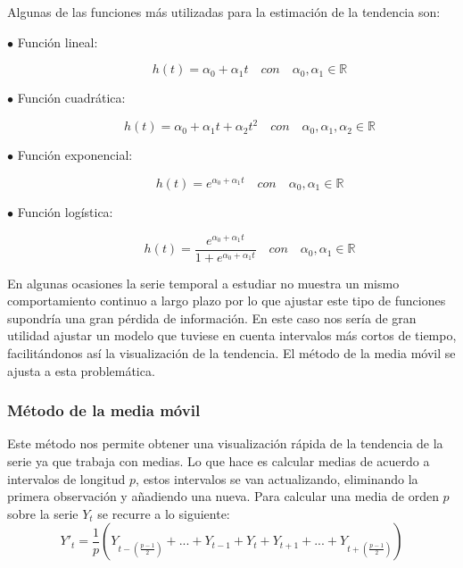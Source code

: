 Algunas de las funciones más utilizadas para la estimación de la tendencia son:
\begin{description}
  \item[$\bullet$ Función lineal:]
      \begin{equation}
        h(t) = \alpha_0 + \alpha_1 t \quad con \quad \alpha_0, \alpha_1 \in \mathbb{R}
      \end{equation}
  \item[$\bullet$ Función cuadrática:]
      \begin{equation}
        h(t) = \alpha_0 + \alpha_1 t + \alpha_2 t^2 \quad con \quad \alpha_0, \alpha_1, \alpha_2 \in \mathbb{R}
      \end{equation}
  \item[$\bullet$ Función exponencial:]
      \begin{equation}
        h(t) = e^{\alpha_0 + \alpha_1 t} \quad con \quad \alpha_0, \alpha_1 \in \mathbb{R}
      \end{equation}
  \item[$\bullet$ Función logística:]
      \begin{equation}
        h(t) = \frac{e^{\alpha_0 + \alpha_1 t}}{1 + e^{\alpha_0 + \alpha_1 t}} \quad con \quad \alpha_0, \alpha_1 \in \mathbb{R}
      \end{equation}
\end{description}

En algunas ocasiones la serie temporal a estudiar no muestra un mismo comportamiento continuo a largo plazo por lo que ajustar este tipo de funciones supondría una gran pérdida de información. En este caso nos sería de gran utilidad ajustar un modelo que tuviese en cuenta intervalos más cortos de tiempo, facilitándonos así la visualización de la tendencia. El método de la media móvil se ajusta a esta problemática.

\subsubsection{Método de la media móvil}

Este método nos permite obtener una visualización rápida de la tendencia de la serie ya que trabaja con medias. Lo que hace es calcular medias de acuerdo a intervalos de longitud $p$, estos intervalos se van actualizando, eliminando la primera observación y añadiendo una nueva. Para calcular una media de orden $p$ sobre la serie $Y_t$ se recurre a lo siguiente:
\begin{equation}
    Y'_{t} = \frac{1}{p}\left(Y_{t-\left(\frac{p-1}{2}\right)}+...+Y_{t-1}+Y_t+Y_{t+1}+...+Y_{t+\left(\frac{p-1}{2}\right)}\right)
\end{equation}

